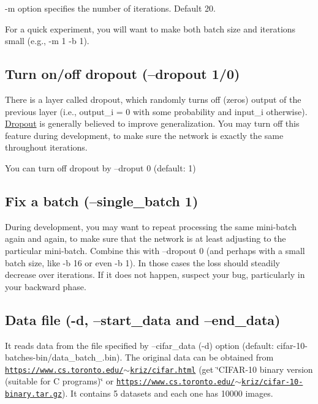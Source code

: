 -\/m option specifies the number of iterations. Default 20.

For a quick experiment, you will want to make both batch size and iterations small (e.\+g., -\/m 1 -\/b 1).

\subsection*{Turn on/off dropout (--dropout 1/0) }

There is a layer called dropout, which randomly turns off (zeros) output of the previous layer (i.\+e., output\+\_\+i = 0 with some probability and input\+\_\+i otherwise). \hyperlink{structDropout}{Dropout} is generally believed to improve generalization. You may turn off this feature during development, to make sure the network is exactly the same throughout iterations.

You can turn off dropout by --droput 0 (default\+: 1)

\subsection*{Fix a batch (--single\+\_\+batch 1) }

During development, you may want to repeat processing the same mini-\/batch again and again, to make sure that the network is at least adjusting to the particular mini-\/batch. Combine this with --dropout 0 (and perhaps with a small batch size, like -\/b 16 or even -\/b 1). In those cases the loss should steadily decrease over iterations. If it does not happen, suspect your bug, particularly in your backward phase.

\subsection*{Data file (-\/d, --start\+\_\+data and --end\+\_\+data) }

It reads data from the file specified by --cifar\+\_\+data (-\/d) option (default\+: cifar-\/10-\/batches-\/bin/data\+\_\+batch\+\_.\+bin). The original data can be obtained from \href{https://www.cs.toronto.edu/~kriz/cifar.html}{\tt https\+://www.\+cs.\+toronto.\+edu/$\sim$kriz/cifar.\+html} (get \char`\"{}\+C\+I\+F\+A\+R-\/10 binary version (suitable for C programs)\char`\"{} or \href{https://www.cs.toronto.edu/~kriz/cifar-10-binary.tar.gz}{\tt https\+://www.\+cs.\+toronto.\+edu/$\sim$kriz/cifar-\/10-\/binary.\+tar.\+gz}). It contains 5 datasets and each one has 10000 images.

